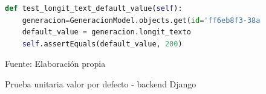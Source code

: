 \documentclass[../Main.tex]{subfiles}
\begin{document}
    \begin{figure}[H]
	\begin{Center}
    \begin{lstlisting}[language=Python]
def test_longit_text_default_value(self):
    generacion=GeneracionModel.objects.get(id='ff6eb8f3-38a1')
    default_value = generacion.longit_texto
    self.assertEquals(default_value, 200)\end{lstlisting}
        \caption{Prueba unitaria valor por defecto - backend Django}
	    Fuente: Elaboración propia
        \label{fig:section}
	\end{Center}
    \end{figure}
\end{document}
